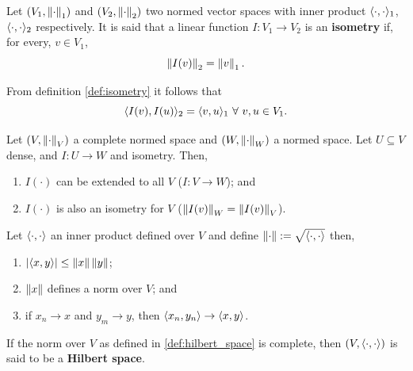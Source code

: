 \documentclass[../TGMAFFIRO]{subfiles}
\begin{document}
\begin{definition}\label{def:isometry}
	Let $(V_1, \left\lVert\cdot\right\rVert_1)$ and $(V_2, \left\lVert\cdot\right\rVert_2)$ two normed vector spaces with inner product $\langle \cdot, \cdot\rangle_1$, $\langle \cdot, \cdot\rangle_2$ respectively. It is said that a linear function $I:V_1\to V_2$ is an \textbf{isometry} if, for every, $v\in V_1$,
	\begin{equation}
		\left\lVert I(v)\right\rVert_2  = \left\lVert v\right\rVert_1.
	\end{equation}
\end{definition}

\begin{remark}
	From definition \ref{def:isometry} it follows that
	\begin{equation}
		\innerprod{I(v)}{I(u)}_2 = \innerprod{v}{u}_1 \ \forall \ v,u\in V_1.
	\end{equation}
\end{remark}

\begin{proposition}
	Let $(V, \left\lVert\cdot\right\rVert_V)$ a complete normed space and $(W, \left\lVert\cdot\right\rVert_W)$ a normed space. Let $U\subseteq V$ dense, and $I:U\to W$ and isometry. Then,
	\begin{enumerate}
		\item $I(\cdot)$ can be extended to all $V$ ($I: V\to W$); and
		\item $I(\cdot)$ is also an isometry for $V$ ($\left\lVert I(v)\right\rVert_W = \left\lVert I(v)\right\rVert_V$).
	\end{enumerate}
\end{proposition}

\begin{proposition}\label{def:hilbert_space}
	Let $\langle \cdot, \cdot\rangle$	 an inner product defined over $V$ and define $\left\lVert\cdot\right\rVert:=\sqrt{\langle \cdot, \cdot\rangle}$ then,
	\begin{enumerate}
		\item $|\langle x, y\rangle| \leq \left\lVert x\right\rVert \left\lVert y\right\rVert$;
		\item $\left\lVert x\right\rVert$ defines a norm over $V$; and
		\item if $x_n \to x$ and $y_m \to y$, then $\langle x_n, y_n\rangle \to \langle x, y\rangle$.
	\end{enumerate}
\end{proposition}

\begin{remark}
	If the norm over $V$ as defined in \ref{def:hilbert_space} is complete, then $(V, \langle \cdot, \cdot\rangle)$ is said to be a \textbf{Hilbert space}.
\end{remark}
\end{document}
